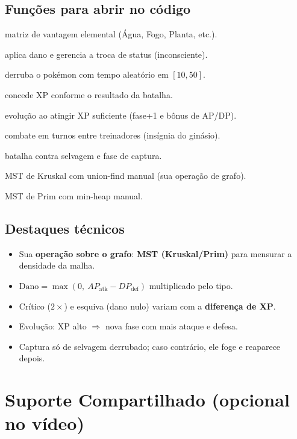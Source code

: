 \documentclass[11pt,a4paper]{article}
\begin{document}
\subsection{Funções para abrir no código}
\begin{description}[leftmargin=6em,style=nextline]
  \item[\texttt{multiplicadorTipo}] matriz de vantagem elemental (Água, Fogo, Planta, etc.).
  \item[\texttt{aplicarDano}] aplica dano e gerencia a troca de status (inconsciente).
  \item[\texttt{deixarInconsciente}] derruba o pokémon com tempo aleatório em $[10,50]$.
  \item[\texttt{ganharXP}] concede XP conforme o resultado da batalha.
  \item[\texttt{tentarEvoluir}] evolução ao atingir XP suficiente (fase+1 e bônus de AP/DP).
  \item[\texttt{batalharTreinador}] combate em turnos entre treinadores (insígnia do ginásio).
  \item[\texttt{batalharSelvagem}] batalha contra selvagem e fase de captura.
  \item[\texttt{mstKruskal}] MST de Kruskal com union-find manual (sua operação de grafo).
  \item[\texttt{mstPrim}] MST de Prim com min-heap manual.
\end{description}

\subsection{Destaques técnicos}
\begin{itemize}[leftmargin=2em,itemsep=2pt]
  \item Sua \textbf{operação sobre o grafo}: \textbf{MST (Kruskal/Prim)} para mensurar a densidade da malha.
  \item $\text{Dano} = \max(0,\ AP_\text{atk} - DP_\text{def})$ multiplicado pelo tipo.
  \item Crítico ($2\times$) e esquiva (dano nulo) variam com a \textbf{diferença de XP}.
  \item Evolução: XP alto $\Rightarrow$ nova fase com mais ataque e defesa.
  \item Captura só de selvagem derrubado; caso contrário, ele foge e reaparece depois.
\end{itemize}

\section{Suporte Compartilhado (opcional no vídeo)}
\end{document}
